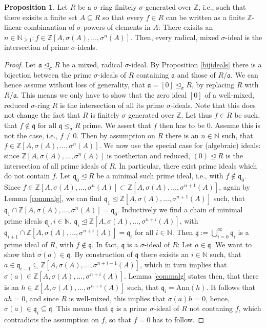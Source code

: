 \documentclass{article}
\def\NE{\mathbb{N}_{\geq1}}
\def\N{\mathbb{N}}
\def\Z{\mathbb{Z}}
\def\a{\mathfrak{a}}
\def\q{\mathfrak{q}}
\def\s{\sigma}
\def\si{\unlhd_{\sigma}}
\def\fa{\text{ for all }}
\newenvironment{bew}{\begin{proof}[Proof]}{\end{proof}}
\theoremstyle{definition}
\newtheorem{prop}[Satz]{Proposition}
\begin{document}
\begin{prop}\label{mixedintersectionprimesfinite}
Let $R$ be a $\s$-ring finitely $\s$-generated over $\Z$, i.e., such that there exisits a finite set $A \subseteq R$ so that every $f \in R$ can be written as a finite $\Z$-linear combinantion of $\s$-powers of elements in $A$: 
There exisits an $n \in \NE: f \in \Z[A,\sigma(A),\ldots,\s^n(A)]$. Then, every radical, mixed $\s$-ideal is the intersection of prime $\s$-ideals.
\begin{bew}
Let $\a \si R$ be a mixed, radical $\s$-ideal. By Proposition \ref{bijideals} there is a bijection between the prime $\s$-ideals of $R$ containing $\a$ and those of $R/\a$. We can hence assume without loss of generality, that $\a = [0] \si R$,
 by replacing $R$ with $R/\a$. This means we only have to show that the zero ideal $[0]$ of a well-mixed, reduced $\s$-ring $R$ is the intersection of all its prime $\s$-ideals. Note that this does not change the fact
that $R$ is finitely $\s$ generated over $\Z$. Let thus $f \in R$ be such, 
that $f \notin \q \fa \q \si R$ prime. We assert that $f$ then has to be $0$. Assume this is not the case, i.e., $f \neq 0$. Then by assumption on $R$ there is an $n \in \N$ such, that $f \in \Z[A,\s(A),\ldots,\s^n(A)]$.
We now use the special case for (algebraic) ideals: since $\Z[A,\s(A),\ldots,\s^n(A)]$ is noetherian and reduced, $(0) \unlhd R$ is the intersection of all prime ideals of $R$. In particular, there exist prime ideals which do not contain $f$.
Let $\q_0 \unlhd R$ be a minimal such prime ideal, i.e., with $f \notin \q_0$. Since $f \in \Z[A,\s(A),\ldots,\s^n(A)] \subset \Z[A,\s(A),\ldots,\s^{n+1}(A)]$, again by Lemma \ref{commalg}, we can find $\q_1 \unlhd \Z[A,\s(A),\ldots,\s^{n+1}(A)]$
such, that $\q_1 \cap \Z[A,\s(A),\ldots,\s^{n}(A)] = \q_0$. Inductively we find a chain of minimal prime ideals $\q_i, i \in \N$, $\q_i \unlhd \Z[A,\s(A),\ldots,\s^{n+i}(A)]$, with $\q_{i+1} \cap \Z[A,\s(A),\ldots,\s^{n+i}(A)] = \q_i$ for all $i \in \N$.
Then $\q := \bigcup_{i=0}^{\infty} \q_i$ is a prime ideal of $R$, with $f \notin \q$. In fact, $\q$ is a $\s$-ideal of $R$: Let $a \in \q$. We want to show that $\s(a) \in \q$. By construction of $\q$ there exisits an $i \in \N$ such,
that $a \in \q_{i-1} \subseteq \Z[A,\s(A),\ldots,\s^{n+i-1}(A)]$, which in turn implies that $\s(a) \in \Z[A,\s(A),\ldots,\s^{n+i}(A)]$. Lemma \ref{commalg} states then, that there is an $h \in \Z[A,\s(A),\ldots,\s^{n+i}(A)]$ such, that $ \q_i = \text{Ann}(h)$.
It follows that $ah = 0$, and since $R$ is well-mixed, this implies that $\s(a)h = 0$, hence, $\s(a) \in \q_i \subseteq \q$. This means that $\q$ is a prime $\s$-ideal of $R$ not contaning $f$, which contradicts the assumption on $f$, so that $f = 0$ has to follow.
\end{bew}
\end{prop}
\end{document}
